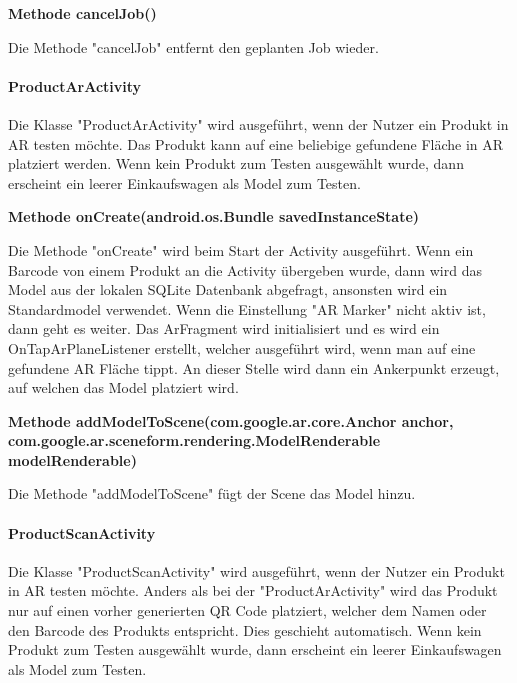 \documentclass{scrartcl}
\begin{document}
\noindent\textbf{Methode cancelJob()}

\noindent Die Methode "cancelJob" entfernt den geplanten Job wieder. \newline

\newpage

\paragraph{ProductArActivity} Die Klasse "ProductArActivity" wird ausgeführt, wenn der Nutzer ein Produkt in AR testen möchte. Das Produkt kann auf eine beliebige gefundene Fläche in AR platziert werden. Wenn kein Produkt zum Testen ausgewählt wurde, dann erscheint ein leerer Einkaufswagen als Model zum Testen. \newline

\noindent\textbf{Methode onCreate(android.os.Bundle savedInstanceState)} 

\noindent Die Methode "onCreate" wird beim Start der Activity ausgeführt. Wenn ein Barcode von einem Produkt an die Activity übergeben wurde, dann wird das Model aus der lokalen SQLite Datenbank abgefragt, ansonsten wird ein Standardmodel verwendet. Wenn die Einstellung "AR Marker" nicht aktiv ist, dann geht es weiter. Das ArFragment wird initialisiert und es wird ein OnTapArPlaneListener erstellt, welcher ausgeführt wird, wenn man auf eine gefundene AR Fläche tippt. An dieser Stelle wird dann ein Ankerpunkt erzeugt, auf welchen das Model platziert wird.\newline

\noindent\textbf{Methode addModelToScene(com.google.ar.core.Anchor anchor, \newline com.google.ar.sceneform.rendering.ModelRenderable modelRenderable)} 

\noindent Die Methode "addModelToScene" fügt der Scene das Model hinzu. \newline 



\paragraph{ProductScanActivity} Die Klasse "ProductScanActivity" wird ausgeführt, wenn der Nutzer ein Produkt in AR testen möchte. Anders als bei der "ProductArActivity" wird das Produkt nur auf einen vorher generierten QR Code platziert, welcher dem Namen oder den Barcode des Produkts entspricht. Dies geschieht automatisch. Wenn kein Produkt zum Testen ausgewählt wurde, dann erscheint ein leerer Einkaufswagen als Model zum Testen. \newline
\end{document}
